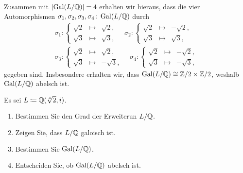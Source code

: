 \begin{solution}
\begin{enumerate}
      Zusammen mit $|{\operatorname{Gal}(L / \mathbb{Q})}| = 4$ erhalten wir hieraus, dass die vier Automorphismen $\sigma_1, \sigma_2, \sigma_3, \sigma_4 \colon \operatorname{Gal}(L / \mathbb{Q})$ durch
      \begin{gather*}
        \sigma_1 \colon
        \left\{
          \begin{array}{ccr}
            \sqrt{2} & \mapsto  & \sqrt{2}, \\
            \sqrt{3} & \mapsto  & \sqrt{3},
          \end{array}
        \right.
        \quad
        \sigma_2 \colon
        \left\{
          \begin{array}{ccr}
            \sqrt{2} & \mapsto  & -\sqrt{2},  \\
            \sqrt{3} & \mapsto  &  \sqrt{3},
          \end{array}
        \right.
        \\
        \sigma_3 \colon
        \left\{
          \begin{array}{ccr}
            \sqrt{2} & \mapsto  &  \sqrt{2},  \\
            \sqrt{3} & \mapsto  & -\sqrt{3},
          \end{array}
        \right.
        \quad
        \sigma_4 \colon
        \left\{
          \begin{array}{ccr}
            \sqrt{2} & \mapsto  & -\sqrt{2},  \\
            \sqrt{3} & \mapsto  & -\sqrt{3},
          \end{array}
        \right.
      \end{gather*}
      gegeben sind.
      Insbesondere erhalten wir, dass $\operatorname{Gal}(L / \mathbb{Q}) \cong \mathbb{Z}/2 \times \mathbb{Z}/2$,
      weshalb $\operatorname{Gal}(L / \mathbb{Q})$ abelsch ist.
  \end{enumerate}
\end{solution}


\begin{question}
  Es sei $L \coloneqq \mathbb{Q}(\sqrt[4]{2}, i)$.
  \begin{enumerate}
    \item
      Bestimmen Sie den Grad der Erweiterun $L/\mathbb{Q}$.
    \item
      Zeigen Sie, dass $L/\mathbb{Q}$ galoisch ist.
    \item
      Bestimmen Sie $\operatorname{Gal}(L / \mathbb{Q})$.
    \item
      Entscheiden Sie, ob $\operatorname{Gal}(L / \mathbb{Q})$ abelsch ist.
  \end{enumerate}
\end{question}


